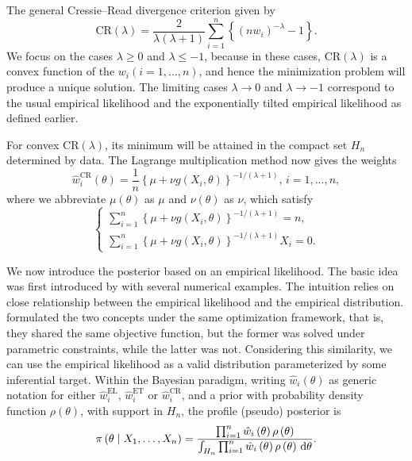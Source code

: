 The general Cressie--Read divergence criterion given by 
\[
\mathrm{CR}\left(\lambda\right)=\frac{2}{\lambda\left(\lambda+1\right)}\sum_{i=1}^{n}\left\{ \left(nw_{i}\right)^{-\lambda}-1\right\} .
\]
We focus on the cases $\lambda\ge0$ and $\lambda\le-1$, because
in these cases, $\mathrm{CR}\left(\lambda\right)$ is a convex function
of the $w_{i}\left(i=1,\ldots,n\right)$, and hence the minimization problem will produce a unique solution.  The limiting cases $\lambda\rightarrow0$
and $\lambda\rightarrow-1$ correspond to the usual empirical likelihood
and the exponentially tilted empirical likelihood as defined earlier. 

For convex $\mathrm{CR}\left(\lambda\right)$, its minimum will be
attained in the compact set $H_{n}$ determined by data. The Lagrange
multiplication method now gives the weights 
\begin{equation}
\hat{w}_{i}^{\mathrm{CR}}\left(\theta\right)=\frac{1}{n}\left\{ \mu+\nu g\left(X_{i},\theta\right)\right\} ^{-1/(\lambda+1)},\, i=1,\ldots,n,\label{eq:weight-cr-el}
\end{equation}
where we abbreviate $\mu\left(\theta\right)$ as $\mu$ and $\nu\left(\theta\right)$ as $\nu$, which
satisfy 
\begin{equation}
\begin{cases}
\sum_{i=1}^{n}\left\{ \mu+\nu g\left(X_{i},\theta\right)\right\} ^{-1/(\lambda+1)}=n,\\
\sum_{i=1}^{n}\left\{ \mu+\nu g\left(X_{i},\theta\right)\right\} ^{-1/(\lambda+1)}X_{i}=0.
\end{cases}\label{eq:lag-mul-cr-el}
\end{equation}


We now introduce the posterior based on an empirical likelihood. The  basic idea was first introduced by \cite{lazar2003bayesian} with several numerical examples. The intuition relies on close relationship between the empirical likelihood and the empirical distribution. \cite{owen2010empirical} formulated the two concepts under the same optimization framework, that is, they shared the same objective function, but the former  was solved under parametric constraints, while the latter was not. Considering this similarity, we can use the empirical likelihood as a valid distribution parameterized by some inferential target. Within the Bayesian paradigm, writing
$\hat{w}_{i}\left(\theta\right)$ as generic notation for either $\hat{w}_{i}^{\mathrm{EL}}$,
$\hat{w}_{i}^{\mathrm{ET}}$ or $\hat{w}_{i}^{\mathrm{CR}}$, and a prior with probability density function $\rho\left(\theta\right)$,
with support in $H_{n}$, the profile (pseudo) posterior is  
\begin{equation}
\pi\left(\theta\mid X_{1},\ldots,X_{n}\right)=\frac{\prod_{i=1}^{n}\hat{w}_{i}\left(\theta\right)\rho\left(\theta\right)}{\int_{H_{n}}\prod_{i=1}^{n}\hat{w}_{i}\left(\theta\right)\rho\left(\theta\right)\,\mathrm{d}\theta}.\label{eq:poster-el-expression}
\end{equation}


